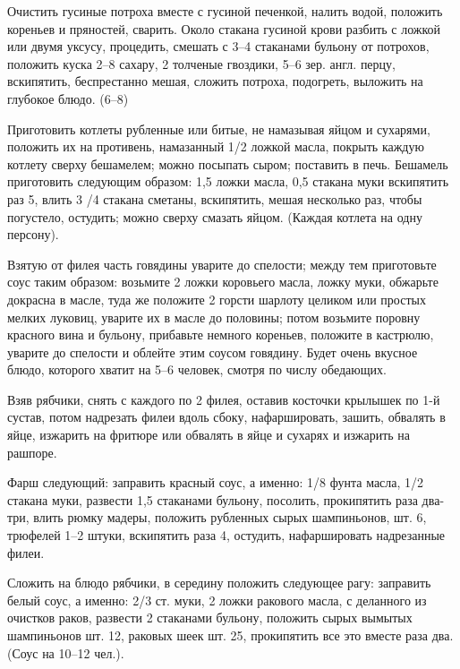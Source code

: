 Очистить гусиные потроха вместе с гусиной печенкой, налить водой, положить кореньев и пряностей, сварить. Около стакана гусиной крови разбить с ложкой или двумя уксусу, процедить, смешать с 3--4 стаканами бульону от потрохов, положить куска 2--8 сахару, 2 толченые гвоздики, 5--6 зер. англ. перцу, вскипятить, беспрестанно мешая, сложить потроха, подогреть, выложить на глубокое блюдо. (6--8) 


Приготовить котлеты рубленные или битые, не намазывая яйцом и сухарями, положить их на противень, намазанный 1/2 ложкой масла, покрыть каждую котлету сверху бешамелем; можно посыпать сыром; поставить в печь. Бешамель приготовить следующим образом: 1,5 ложки масла, 0,5 стакана муки вскипятить раз 5, влить 3 /4 стакана сметаны, вскипятить, мешая несколько раз, чтобы погустело, остудить; можно сверху смазать яйцом. (Каждая котлета на одну персону). 


Взятую от филея часть говядины уварите до спелости; между тем приготовьте соус таким образом: возьмите 2 ложки коровьего масла, ложку муки, обжарьте докрасна в масле, туда же положите 2 горсти шарлоту целиком или простых мелких луковиц, уварите их в масле до половины; потом возьмите поровну красного вина и бульону, прибавьте немного кореньев, положите в кастрюлю, уварите до спелости и облейте этим соусом говядину. Будет очень вкусное блюдо, которого хватит на 5--6 человек, смотря по числу обедающих. 


Взяв рябчики, снять с каждого по 2 филея, оставив косточки крылышек по 1-й сустав, потом надрезать филеи вдоль сбоку, нафаршировать, зашить, обвалять в яйце, изжарить на фритюре или обвалять в яйце и сухарях и изжарить на рашпоре. 

Фарш следующий: заправить красный соус, а именно: 1/8 фунта масла, 1/2 стакана муки, развести 1,5 стаканами бульону, посолить, прокипятить раза два-три, влить рюмку мадеры, положить рубленных сырых шампиньонов, шт. 6, трюфелей 1--2 штуки, вскипятить раза 4, остудить, нафаршировать надрезанные филеи. 

Сложить на блюдо рябчики, в середину положить следующее рагу: заправить белый соус, а именно: 2/3 ст. муки, 2 ложки ракового масла, с деланного из очистков раков, развести 2 стаканами бульону, положить сырых вымытых шампиньонов шт. 12, раковых шеек шт. 25, прокипятить все это вместе раза два. (Соус на 10--12 чел.). 


